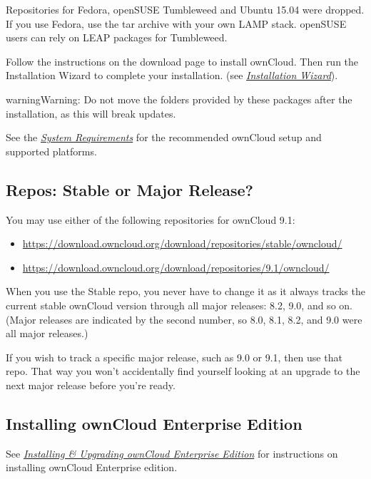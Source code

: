 \documentclass[letterpaper,10pt,english]{sphinxmanual}
\begin{document}
Repositories for Fedora, openSUSE Tumbleweed and Ubuntu 15.04 were dropped. If
you use Fedora, use the tar archive with your own LAMP stack. openSUSE
users can rely on LEAP packages for Tumbleweed.

Follow the instructions on the download page to install ownCloud. Then run the
Installation Wizard to complete your installation. (see
{\hyperref[installation/installation_wizard::doc]{\emph{Installation Wizard}}}).

\begin{notice}{warning}{Warning:}
Do not move the folders provided by these packages after the
installation, as this will break updates.
\end{notice}

See the {\hyperref[installation/system_requirements::doc]{\emph{System Requirements}}} for the recommended ownCloud setup and
supported platforms.


\subsection{Repos: Stable or Major Release?}
\label{installation/linux_installation:repos-stable-or-major-release}
You may use either of the following repositories for ownCloud 9.1:
\begin{itemize}
\item {} 
\href{https://download.owncloud.org/download/repositories/stable/owncloud/}{https://download.owncloud.org/download/repositories/stable/owncloud/}

\item {} 
\href{https://download.owncloud.org/download/repositories/9.1/owncloud/}{https://download.owncloud.org/download/repositories/9.1/owncloud/}

\end{itemize}

When you use the Stable repo, you never have to change it as it always tracks
the current stable ownCloud version through all major releases: 8.2, 9.0,
and so on. (Major releases are indicated by the second number, so 8.0, 8.1,
8.2, and 9.0 were all major releases.)

If you wish to track a specific major release, such as 9.0 or 9.1, then use
that repo. That way you won't accidentally find yourself looking at an upgrade
to the next major release before you're ready.


\subsection{Installing ownCloud Enterprise Edition}
\label{installation/linux_installation:installing-owncloud-enterprise-edition}
See {\hyperref[enterprise_installation/linux_installation::doc]{\emph{Installing \& Upgrading ownCloud Enterprise Edition}}} for instructions on
installing ownCloud Enterprise edition.
\end{document}
